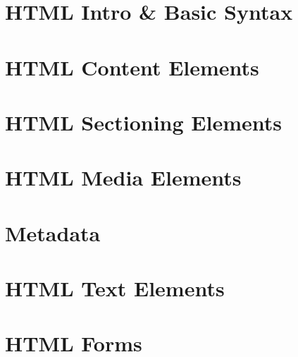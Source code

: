 \documentclass[b5paper,openany]{book}
\begin{document}
\tp


\tableofcontents



\chapter{HTML Intro \& Basic Syntax}


\chapter{HTML Content Elements}


\chapter{HTML Sectioning Elements}


\chapter{HTML Media Elements}


\chapter{Metadata}


\chapter{HTML Text Elements}


\chapter{HTML Forms}





\end{document}
